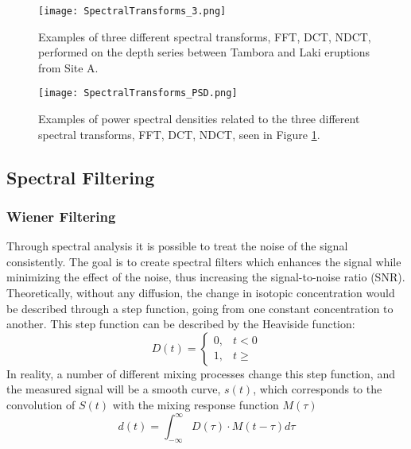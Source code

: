 \documentclass[../../CompleteThesis/Complete_1stDraft]{subfiles}
\begin{document}
	\begin{figure}[h]
		\centering
		\texttt{[image: SpectralTransforms\_3.png]}
		\caption[FFT, DCT, NDCT, Site A]{Examples of three different spectral transforms, FFT, DCT, NDCT, performed on the depth series between Tambora and Laki eruptions from Site A.}
		\label{fig:SpectralTransforms_3}
	\end{figure}
	
	\begin{figure}[h]
		\centering
		\texttt{[image: SpectralTransforms\_PSD.png]}
		\caption[FFT, DCT, NDCT PSDs, Site A]{Examples of power spectral densities related to the three different spectral transforms, FFT, DCT, NDCT, seen in Figure \ref{fig:SpectralTransforms_3}.}
		\label{fig:SpectralTransforms_PSD}
	\end{figure}
	
	
	
	\subsection[Spectral Filtering][Spectral Filtering]{Spectral Filtering}
	\label{Subsec:SignalAnalysis_BackDiffusion_SpectralFiltering}
	\subsubsection[Wiener Filtering][Wiener Filtering]{Wiener Filtering}
	\label{Subsubsec:SignalAnalysis_BackDiffusion_SpectralFiltering_Wiener}
	Through spectral analysis it is possible to treat the noise of the signal consistently. The goal is to create spectral filters which enhances the signal while minimizing the effect of the noise, thus increasing the signal-to-noise ratio (SNR).\\
	Theoretically, without any diffusion, the change in isotopic concentration would be described through a step function, going from one constant concentration to another. This step function can be described by the Heaviside function:
	\begin{equation}
		D(t) = \begin{cases}
			0, & t < 0 \\
			1, & t \geq
		\end{cases}
	\end{equation}
	In reality, a number of different mixing processes change this step function, and the measured signal will be a smooth curve, $s(t)$, which corresponds to the convolution of $S(t)$ with the mixing response function $M(\tau)$
	\begin{equation}
		d(t) = \int_{- \infty}^{\infty} D(\tau) \cdot M(t - \tau)d\tau
	\end{equation}
	
\end{document}
